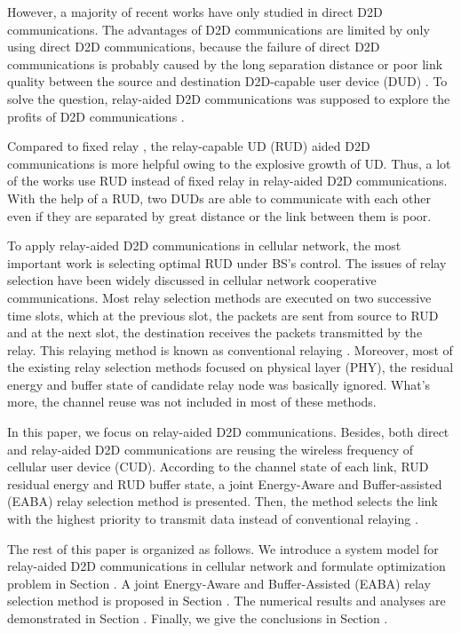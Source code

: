 \documentclass[conference]{IEEEtran}
\begin{document}
However, a majority of recent works have only studied in direct D2D communications. The advantages of D2D communications are limited by only using direct D2D communications, because the failure of direct D2D communications is probably caused by the long separation distance or poor link quality between the source and destination D2D-capable user device (DUD) \cite{7876267}. To solve the question, relay-aided D2D communications was supposed to explore the profits of D2D communications \cite{7450161,7752964}.

Compared to fixed relay \cite{6775376}, the relay-capable UD (RUD) aided D2D communications is more helpful owing to the explosive growth of UD. Thus, a lot of the works use RUD instead of fixed relay in relay-aided D2D communications. With the help of a RUD, two DUDs are able to communicate with each other even if they are separated by great distance or the link between them is poor\cite{7450161,7752964}.

To apply relay-aided D2D communications in cellular network, the most important work is selecting optimal RUD under BS's control. The issues of relay selection have been widely discussed in cellular network cooperative communications. Most relay selection methods are executed on two successive time slots, which at the previous slot, the packets are sent from source to RUD and at the next slot, the destination receives the packets transmitted by the relay. This relaying method is known as conventional relaying \cite{6807959}. Moreover, most of the existing relay selection methods focused on physical layer (PHY), the residual energy and buffer state of candidate relay node was basically ignored. What's more, the channel reuse was not included in most of these methods.

In this paper, we focus on relay-aided D2D communications. Besides, both direct and relay-aided D2D communications are reusing the wireless frequency of cellular user device (CUD). According to the channel state of each link, RUD residual energy and RUD buffer state, a joint  Energy-Aware and Buffer-assisted (EABA) relay selection method is presented. Then, the method selects the link with the highest priority to transmit data instead of conventional relaying \cite{7562509}.

The rest of this paper is organized as follows. We introduce a system model for relay-aided D2D communications in cellular network and formulate optimization problem in Section \uppercase\expandafter{}. A joint Energy-Aware and Buffer-Assisted (EABA) relay selection method is proposed in Section \uppercase\expandafter{}. The numerical results and analyses are demonstrated in Section \uppercase\expandafter{}. Finally, we give the conclusions in Section \uppercase\expandafter{}.
\end{document}
